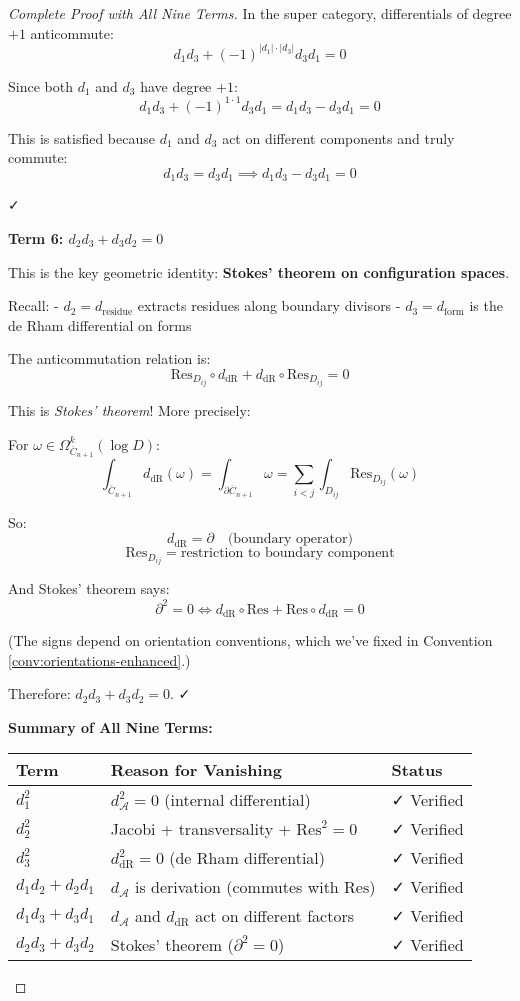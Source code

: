 \begin{proof}[Complete Proof with All Nine Terms]
In the super category, differentials of degree $+1$ anticommute:
$$d_1 d_3 + (-1)^{|d_1| \cdot |d_3|} d_3 d_1 = 0$$

Since both $d_1$ and $d_3$ have degree $+1$:
$$d_1 d_3 + (-1)^{1 \cdot 1} d_3 d_1 = d_1 d_3 - d_3 d_1 = 0$$

This is satisfied because $d_1$ and $d_3$ act on different components and truly commute:
$$d_1 d_3 = d_3 d_1 \implies d_1 d_3 - d_3 d_1 = 0$$

✓

\medskip
\noindent\textbf{Term 6: $d_2 d_3 + d_3 d_2 = 0$}

This is the key geometric identity: \textbf{Stokes' theorem on configuration spaces}.

Recall:
- $d_2 = d_{\text{residue}}$ extracts residues along boundary divisors
- $d_3 = d_{\text{form}}$ is the de Rham differential on forms

The anticommutation relation is:
$$\text{Res}_{D_{ij}} \circ d_{\text{dR}} + d_{\text{dR}} \circ \text{Res}_{D_{ij}} = 0$$

This is \emph{Stokes' theorem}! More precisely:

For $\omega \in \Omega^k_{\overline{C}_{n+1}}(\log D)$:
$$\int_{\overline{C}_{n+1}} d_{\text{dR}}(\omega) = \int_{\partial\overline{C}_{n+1}} \omega = \sum_{i<j} \int_{D_{ij}} \text{Res}_{D_{ij}}(\omega)$$

So:
$$d_{\text{dR}} = \partial \quad \text{(boundary operator)}$$
$$\text{Res}_{D_{ij}} = \text{restriction to boundary component}$$

And Stokes' theorem says:
$$\partial^2 = 0 \iff d_{\text{dR}} \circ \text{Res} + \text{Res} \circ d_{\text{dR}} = 0$$

(The signs depend on orientation conventions, which we've fixed in Convention \ref{conv:orientations-enhanced}.)

Therefore: $d_2 d_3 + d_3 d_2 = 0$. ✓

\medskip
\noindent\textbf{Summary of All Nine Terms:}

\begin{center}
\begin{tabular}{|l|l|l|}
\hline
\textbf{Term} & \textbf{Reason for Vanishing} & \textbf{Status} \\
\hline
$d_1^2$ & $d_\mathcal{A}^2 = 0$ (internal differential) & ✓ Verified \\
$d_2^2$ & Jacobi + transversality + $\text{Res}^2=0$ & ✓ Verified \\
$d_3^2$ & $d_{\text{dR}}^2 = 0$ (de Rham differential) & ✓ Verified \\
$d_1 d_2 + d_2 d_1$ & $d_\mathcal{A}$ is derivation (commutes with $\text{Res}$) & ✓ Verified \\
$d_1 d_3 + d_3 d_1$ & $d_\mathcal{A}$ and $d_{\text{dR}}$ act on different factors & ✓ Verified \\
$d_2 d_3 + d_3 d_2$ & Stokes' theorem ($\partial^2 = 0$) & ✓ Verified \\
\hline
\end{tabular}
\end{center}


\end{proof}
